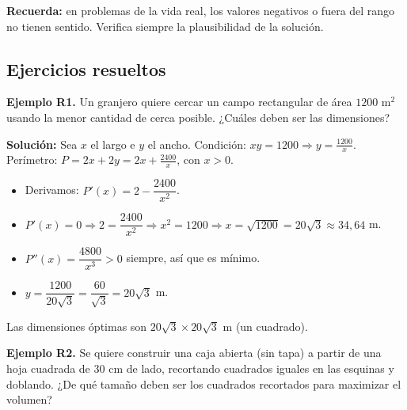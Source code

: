 \documentclass[12pt, letterpaper]{article}
\begin{document}
\begin{cuadroadvertencia}
  \textbf{Recuerda:} en problemas de la vida real, los valores negativos o fuera del rango no tienen sentido. Verifica siempre la plausibilidad de la solución.
\end{cuadroadvertencia}

\subsection{Ejercicios resueltos}

\textbf{Ejemplo R1.} Un granjero quiere cercar un campo rectangular de área $1200$ m$^2$ usando la menor cantidad de cerca posible. ¿Cuáles deben ser las dimensiones?

\begin{cuadrosolucion}
  \textbf{Solución:} Sea $x$ el largo e $y$ el ancho. Condición: $xy = 1200 \Rightarrow y = \frac{1200}{x}$. Perímetro: $P = 2x + 2y = 2x + \frac{2400}{x}$, con $x > 0$.
  \begin{itemize}
    \item Derivamos: $P'(x) = 2 - \dfrac{2400}{x^2}$.
    \item $P'(x) = 0 \Rightarrow 2 = \dfrac{2400}{x^2} \Rightarrow x^2 = 1200 \Rightarrow x = \sqrt{1200} = 20\sqrt{3} \approx 34{,}64$ m.
    \item $P''(x) = \dfrac{4800}{x^3} > 0$ siempre, así que es mínimo.
    \item $y = \dfrac{1200}{20\sqrt{3}} = \dfrac{60}{\sqrt{3}} = 20\sqrt{3}$ m.
  \end{itemize}
  Las dimensiones óptimas son $20\sqrt{3} \times 20\sqrt{3}$ m (un cuadrado).
\end{cuadrosolucion}

\textbf{Ejemplo R2.} Se quiere construir una caja abierta (sin tapa) a partir de una hoja cuadrada de $30$ cm de lado, recortando cuadrados iguales en las esquinas y doblando. ¿De qué tamaño deben ser los cuadrados recortados para maximizar el volumen?
\end{document}
